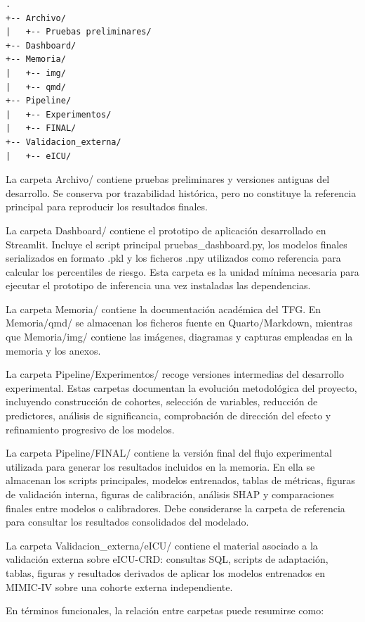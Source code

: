\documentclass[
  spanish,
  a4paper,
  12pt,
  twoside]{memoir}
\newcommand{\ruta}[1]{{\sffamily #1}}
\begin{document}
\begin{verbatim}
.
+-- Archivo/
|   +-- Pruebas preliminares/
+-- Dashboard/
+-- Memoria/
|   +-- img/
|   +-- qmd/
+-- Pipeline/
|   +-- Experimentos/
|   +-- FINAL/
+-- Validacion_externa/
|   +-- eICU/
\end{verbatim}

La carpeta \ruta{Archivo/} contiene pruebas preliminares y versiones antiguas del desarrollo. Se conserva por trazabilidad histórica, pero no constituye la referencia 
principal para reproducir los resultados finales.

La carpeta \ruta{Dashboard/} contiene el prototipo de aplicación desarrollado en Streamlit. Incluye el script principal \ruta{pruebas\_dashboard.py}, los modelos finales 
serializados en formato \ruta{.pkl} y los ficheros \ruta{.npy} utilizados como referencia para calcular los percentiles de riesgo. Esta carpeta es la unidad mínima 
necesaria para ejecutar el prototipo de inferencia una vez instaladas las dependencias.

La carpeta \ruta{Memoria/} contiene la documentación académica del TFG. En \ruta{Memoria/qmd/} se almacenan los ficheros fuente en Quarto/Markdown, mientras que 
\ruta{Memoria/img/} contiene las imágenes, diagramas y capturas empleadas en la memoria y los anexos.

La carpeta \ruta{Pipeline/Experimentos/} recoge versiones intermedias del desarrollo experimental. Estas carpetas documentan la evolución metodológica del proyecto, 
incluyendo construcción de cohortes, selección de variables, reducción de predictores, análisis de significancia, comprobación de dirección del efecto y refinamiento 
progresivo de los modelos.

La carpeta \ruta{Pipeline/FINAL/} contiene la versión final del flujo experimental utilizada para generar los resultados incluidos en la memoria. En ella se almacenan los 
scripts principales, modelos entrenados, tablas de métricas, figuras de validación interna, figuras de calibración, análisis SHAP y comparaciones finales entre modelos 
o calibradores. Debe considerarse la carpeta de referencia para consultar los resultados consolidados del modelado.

La carpeta \ruta{Validacion\_externa/eICU/} contiene el material asociado a la validación externa sobre eICU-CRD: consultas SQL, scripts de adaptación, tablas, figuras y 
resultados derivados de aplicar los modelos entrenados en MIMIC-IV sobre una cohorte externa independiente.

En términos funcionales, la relación entre carpetas puede resumirse como:
\end{document}
